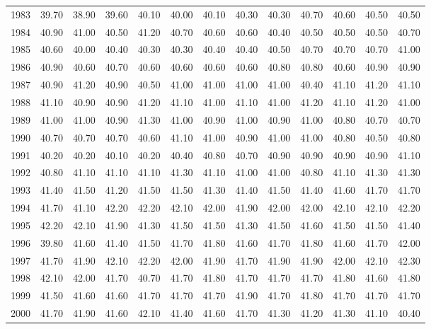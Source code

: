 \begin{longtable}{rrrrrrrrrrrrr}
  1983 & 39.70 & 38.90 & 39.60 & 40.10 & 40.00 & 40.10 & 40.30 & 40.30 & 40.70 & 40.60 & 40.50 & 40.50 \\ 
  1984 & 40.90 & 41.00 & 40.50 & 41.20 & 40.70 & 40.60 & 40.60 & 40.40 & 40.50 & 40.50 & 40.50 & 40.70 \\ 
  1985 & 40.60 & 40.00 & 40.40 & 40.30 & 40.30 & 40.40 & 40.40 & 40.50 & 40.70 & 40.70 & 40.70 & 41.00 \\ 
  1986 & 40.90 & 40.60 & 40.70 & 40.60 & 40.60 & 40.60 & 40.60 & 40.80 & 40.80 & 40.60 & 40.90 & 40.90 \\ 
  1987 & 40.90 & 41.20 & 40.90 & 40.50 & 41.00 & 41.00 & 41.00 & 41.00 & 40.40 & 41.10 & 41.20 & 41.10 \\ 
  1988 & 41.10 & 40.90 & 40.90 & 41.20 & 41.10 & 41.00 & 41.10 & 41.00 & 41.20 & 41.10 & 41.20 & 41.00 \\ 
  1989 & 41.00 & 41.00 & 40.90 & 41.30 & 41.00 & 40.90 & 41.00 & 40.90 & 41.00 & 40.80 & 40.70 & 40.70 \\ 
  1990 & 40.70 & 40.70 & 40.70 & 40.60 & 41.10 & 41.00 & 40.90 & 41.00 & 41.00 & 40.80 & 40.50 & 40.80 \\ 
  1991 & 40.20 & 40.20 & 40.10 & 40.20 & 40.40 & 40.80 & 40.70 & 40.90 & 40.90 & 40.90 & 40.90 & 41.10 \\ 
  1992 & 40.80 & 41.10 & 41.10 & 41.10 & 41.30 & 41.10 & 41.00 & 41.00 & 40.80 & 41.10 & 41.30 & 41.30 \\ 
  1993 & 41.40 & 41.50 & 41.20 & 41.50 & 41.50 & 41.30 & 41.40 & 41.50 & 41.40 & 41.60 & 41.70 & 41.70 \\ 
  1994 & 41.70 & 41.10 & 42.20 & 42.20 & 42.10 & 42.00 & 41.90 & 42.00 & 42.00 & 42.10 & 42.10 & 42.20 \\ 
  1995 & 42.20 & 42.10 & 41.90 & 41.30 & 41.50 & 41.50 & 41.30 & 41.50 & 41.60 & 41.50 & 41.50 & 41.40 \\ 
  1996 & 39.80 & 41.60 & 41.40 & 41.50 & 41.70 & 41.80 & 41.60 & 41.70 & 41.80 & 41.60 & 41.70 & 42.00 \\ 
  1997 & 41.70 & 41.90 & 42.10 & 42.20 & 42.00 & 41.90 & 41.70 & 41.90 & 41.90 & 42.00 & 42.10 & 42.30 \\ 
  1998 & 42.10 & 42.00 & 41.70 & 40.70 & 41.70 & 41.80 & 41.70 & 41.70 & 41.70 & 41.80 & 41.60 & 41.80 \\ 
  1999 & 41.50 & 41.60 & 41.60 & 41.70 & 41.70 & 41.70 & 41.90 & 41.70 & 41.80 & 41.70 & 41.70 & 41.70 \\ 
  2000 & 41.70 & 41.90 & 41.60 & 42.10 & 41.40 & 41.60 & 41.70 & 41.30 & 41.20 & 41.30 & 41.10 & 40.40 \\ 

\end{longtable}
